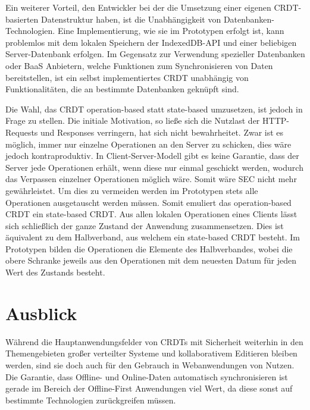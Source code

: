 \documentclass[a4paper, 12pt]{scrreprt}
\begin{document}
Ein weiterer Vorteil, den Entwickler bei der die Umsetzung einer eigenen CRDT-basierten Datenstruktur haben, ist die Unabhängigkeit von Datenbanken-Technologien. Eine Implementierung, wie sie im Prototypen erfolgt ist, kann problemlos mit dem lokalen Speichern der IndexedDB-API und einer beliebigen Server-Datenbank erfolgen. Im Gegensatz zur Verwendung spezieller Datenbanken oder \ac{BaaS} Anbietern, welche Funktionen zum Synchronisieren von Daten bereitstellen, ist ein selbst implementiertes CRDT unabhängig von Funktionalitäten, die an bestimmte Datenbanken geknüpft sind.

Die Wahl, das CRDT operation-based statt state-based umzusetzen, ist jedoch in Frage zu stellen. Die initiale Motivation, so ließe sich die Nutzlast der HTTP-Requests und Responses verringern, hat sich nicht bewahrheitet. Zwar ist es möglich, immer nur einzelne Operationen an den Server zu schicken, dies wäre jedoch kontraproduktiv. In Client-Server-Modell gibt es keine Garantie, dass der Server jede Operationen erhält, wenn diese nur einmal geschickt werden, wodurch das Verpassen einzelner Operationen möglich wäre. Somit wäre \ac{SEC} nicht mehr gewährleistet. Um dies zu vermeiden werden im Prototypen stets alle Operationen ausgetauscht werden müssen. Somit emuliert das operation-based CRDT ein state-based CRDT. Aus allen lokalen Operationen eines Clients lässt sich schließlich der ganze Zustand der Anwendung zusammensetzen. Dies ist äquivalent zu dem Halbverband, aus welchem ein state-based CRDT besteht. Im Prototypen bilden die Operationen die Elemente des Halbverbandes, wobei die obere Schranke jeweils aus den Operationen mit dem neuesten Datum für jeden Wert des Zustands besteht.

\section{Ausblick}

Während die Hauptanwendungsfelder von CRDTs mit Sicherheit weiterhin in den Themengebieten großer verteilter Systeme und kollaborativem Editieren bleiben werden, sind sie doch auch für den Gebrauch in Webanwendungen von Nutzen. Die Garantie, dass Offline- und Online-Daten automatisch synchronisieren ist gerade im Bereich der Offline-First Anwendungen viel Wert, da diese sonst auf bestimmte Technologien zurückgreifen müssen.
\end{document}
